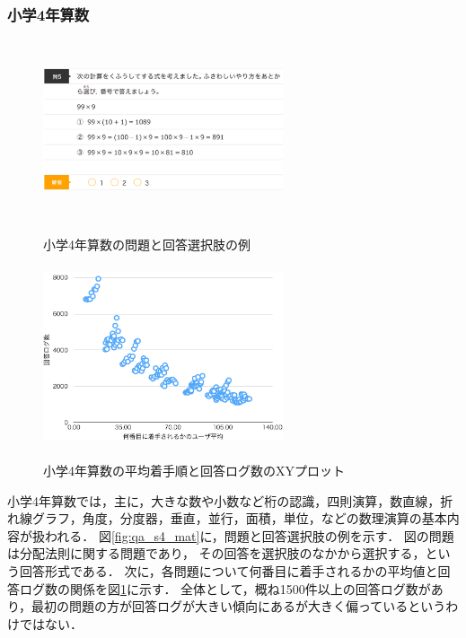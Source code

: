 \subsubsection{小学4年算数}
\begin{figure}[ht]
\begin{center}
	\includegraphics[width=200pt, height=150pt]{./img/qa_s4_mat.png}
	\caption{小学4年算数の問題と回答選択肢の例}
	\label{fig:qa_s4_mat}
\endminipage\hfill
{}
	\includegraphics[width=200pt, height=150pt]{./img/stats_s4_mat.pdf}
	\caption{小学4年算数の平均着手順と回答ログ数のXYプロット}
	\label{fig:stats_s4_mat}
\endminipage\hfill
\end{center}
\end{figure}
小学4年算数では，主に，大きな数や小数など桁の認識，四則演算，数直線，折れ線グラフ，角度，分度器，垂直，並行，面積，単位，などの数理演算の基本内容が扱われる．
図\ref{fig:qa_s4_mat}に，問題と回答選択肢の例を示す．
図の問題は分配法則に関する問題であり，
その回答を選択肢のなかから選択する，という回答形式である．
次に，各問題について何番目に着手されるかの平均値と回答ログ数の関係を図\ref{fig:stats_s4_mat}に示す．
全体として，概ね1500件以上の回答ログ数があり，最初の問題の方が回答ログが大きい傾向にあるが大きく偏っているというわけではない．


